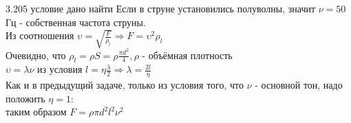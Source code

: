\testCom
{%
	3.205
}
{%
	условие
}
{%
	дано
}
{%
	найти
}
{%
	Если в струне установились полуволны, значит $\nu = 50$Гц - собственная частота струны.\\
	Из соотношения $\upsilon = \sqrt{\frac{F}{\rho_l}} \Rightarrow F = \upsilon^2 \rho_l$\\
	Очевидно, что $\rho_l = \rho S = \rho \frac{\pi d^2}{4}, \rho$ - объёмная плотность\\
	$\upsilon = \lambda \nu$ из условия $l = \eta \frac{\lambda}{2} \Rightarrow \lambda = \frac{2 l}{\eta}$\\
	Как и в предыдущий задаче, только из условия того, что $\nu$ - основной тон, надо положить $\eta = 1$:\\
	таким образом $F = \rho \pi d^2 l^2 \nu^2$\\
}

